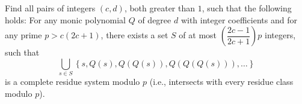 Find all pairs of integers $(c, d)$, both greater than $1$, such that the following holds:
For any monic polynomial $Q$ of degree $d$ with integer coefficients and
for any prime $p > c(2c+1)$, there exists a set $S$ of at most
$\left(\dfrac{2c-1}{2c+1}\right)p$ integers,
such that 
$$ \bigcup_{s\in S} \left\{s, Q(s), Q(Q(s)), Q(Q(Q(s))), \dots\right\}$$
is a complete residue system modulo $p$ (i.e., intersects with every residue
class modulo $p$).
